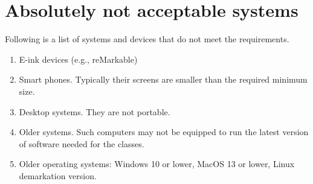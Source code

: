\section{Absolutely not acceptable systems}

Following is a list of systems and devices that do not meet the requirements.

\begin{enumerate}
    \item E-ink devices (e.g., reMarkable)
    \item Smart phones. Typically their screens are smaller than the required minimum size.
    \item Desktop systems. They are not portable.
    \item Older systems. Such computers may not be equipped to run the latest version of software needed for the classes.
    \item Older operating systems: Windows 10 or lower, MacOS 13 or lower, {\color{red} Linux demarkation version.}
\end{enumerate}